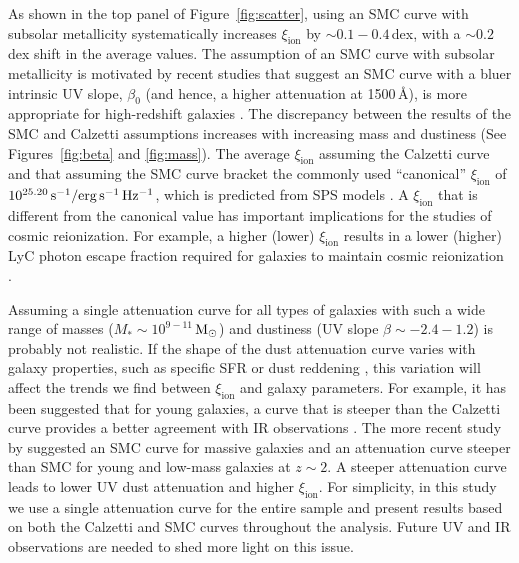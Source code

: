 \documentclass[iop]{emulateapj}
\newcommand{\xiion}{\ensuremath{\xi_{\mathrm{ion}}}}
\def\msun{${\rm M_\odot}$}
\begin{document}
As shown in the top panel of Figure~\ref{fig:scatter}, using an SMC curve with subsolar metallicity systematically increases {\xiion} by $\sim 0.1-0.4$\,dex, with a $\sim 0.2$\,dex shift in the average values. The assumption of an SMC curve with subsolar metallicity is motivated by recent studies that suggest an SMC curve with a bluer intrinsic UV slope, $\beta_0$ (and hence, a higher attenuation at 1500\,\AA), is more appropriate for high-redshift galaxies \citep{reddy17}. 
The discrepancy between the results of the SMC and Calzetti assumptions increases with increasing mass and dustiness (See Figures~\ref{fig:beta} and \ref{fig:mass}). 
The average {\xiion} assuming the Calzetti curve and that assuming the SMC curve bracket the commonly used ``canonical'' {\xiion} of $10^{25.20}\,{\rm{s^{-1}/erg\,s^{-1}\,Hz^{-1}}}$, which is predicted from SPS models \citep{robertson13}. A {\xiion} that is different from the canonical value has important implications for the studies of cosmic reionization. For example, a higher (lower) {\xiion} results in a lower (higher) LyC photon escape fraction required for galaxies to maintain cosmic reionization \citep[we will return to this point in Section~\ref{sec:uv}, also see][]{robertson13,robertson15,bouwens16b,stanway16}.

Assuming a single attenuation curve for all types of galaxies with such a wide range of masses ($M_*\sim 10^{9-11}$\,{\msun}) and dustiness (UV slope $\beta\sim -2.4-1.2$) is probably not realistic. If the shape of the dust attenuation curve varies with galaxy properties, such as specific SFR or dust reddening \citep[as has been shown in other studies, such as][]{noll09,kriek13,reddy15,salmon16}, this variation will affect the trends we find between {\xiion} and galaxy parameters. 
For example, it has been suggested that for young galaxies, a curve that is steeper than the Calzetti curve provides a better agreement with IR observations \citep{reddy06a,siana09,reddy10,shivaei15a}. The more recent study by \citet{reddy17} suggested an SMC curve for massive galaxies and an attenuation curve steeper than SMC for young and low-mass galaxies at $z\sim 2$. A steeper attenuation curve leads to lower UV dust attenuation and higher {\xiion}. For simplicity, in this study we use a single attenuation curve for the entire sample and present results based on both the Calzetti and SMC curves throughout the analysis. Future UV and IR observations are needed to shed more light on this issue.
\end{document}
